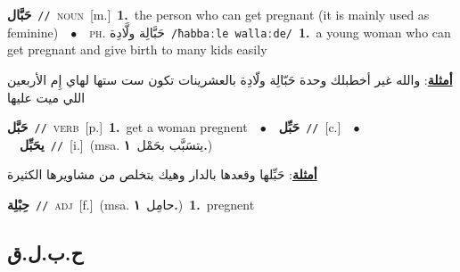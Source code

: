 \documentclass[10pt,a4paper,twoside]{article} %
\begin{document}
\begin{multicols}{2}
{\setlength\topsep{0pt}\textbf{\foreignlanguage{arabic}{حَبَّال}}\ {\color{gray}\texttt{//}\color{black}}\ \textsc{noun}\ [m.]\ \textbf{1.}~the person who can get pregnant (it is mainly used as feminine)\ \ $\bullet$\ \ \textsc{ph.} \color{gray} \foreignlanguage{arabic}{حَبَّالِة ولَّادِة}\color{black}\ {\color{gray}\texttt{/{\sffamily ħabbaːle wallaːde}/}\color{black}}\ \textbf{1.}~a young woman who can get pregnant and give birth to many kids easily\  \begin{flushright}\color{gray}\foreignlanguage{arabic}{\textbf{\underline{\foreignlanguage{arabic}{أمثلة}}}: والله غير أخطبلك وحدة حَبّالِة ولّادِة  بالعشرينات تكون ست ستها لهاي إِم الأربعين اللي ميت عليها}\end{flushright}\color{black}} \vspace{2mm}

{\setlength\topsep{0pt}\textbf{\foreignlanguage{arabic}{حَبَّل}}\ {\color{gray}\texttt{//}\color{black}}\ \textsc{verb}\ [p.]\ \textbf{1.}~get a woman pregnent\ \ $\bullet$\ \ \setlength\topsep{0pt}\textbf{\foreignlanguage{arabic}{حَبِّل}}\ {\color{gray}\texttt{//}\color{black}}\ [c.]\ \ $\bullet$\ \ \setlength\topsep{0pt}\textbf{\foreignlanguage{arabic}{يحَبِّل}}\ {\color{gray}\texttt{//}\color{black}}\ [i.]\ \color{gray}(msa. \foreignlanguage{arabic}{يتسَبَّب بحَمْل}~\foreignlanguage{arabic}{\textbf{١.}})\color{black}\  \begin{flushright}\color{gray}\foreignlanguage{arabic}{\textbf{\underline{\foreignlanguage{arabic}{أمثلة}}}: حَبِّلها وقعدها بالدار وهيك بتخلص من مشاويرها الكثيرة}\end{flushright}\color{black}} \vspace{2mm}

{\setlength\topsep{0pt}\textbf{\foreignlanguage{arabic}{حِبْلِة}}\ {\color{gray}\texttt{//}\color{black}}\ \textsc{adj}\ [f.]\ \color{gray}(msa. \foreignlanguage{arabic}{حامِل}~\foreignlanguage{arabic}{\textbf{١.}})\color{black}\ \textbf{1.}~pregnent\ } \vspace{2mm}

\vspace{-3mm}
\subsection*{\color{blue}\foreignlanguage{arabic}{ح.ب.ل.ق}\color{blue}{ (ntws)}} 


\end{multicols}
\end{document}
